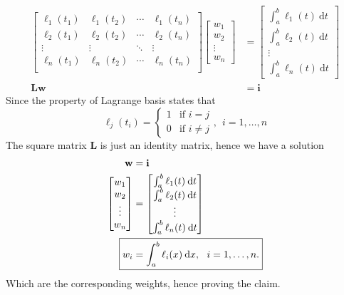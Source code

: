 \begin{align*}
\begin{bmatrix}
\ell_1(t_1) & \ell_1(t_2) & \cdots & \ell_1(t_n) \\
\ell_2(t_1) & \ell_2(t_2) & \cdots & \ell_2(t_n) \\
\vdots & \vdots & \ddots & \vdots\\
\ell_n(t_1) & \ell_n(t_2) & \cdots & \ell_n(t_n) \\
\end{bmatrix}
\begin{bmatrix}
w_1\\
w_2\\
\vdots\\
w_n
\end{bmatrix}
&=
\begin{bmatrix}
\int_{a}^{b}\ell_1(t)\:\mathrm{d}t\\
\int_{a}^{b}\ell_2(t)\:\mathrm{d}t\\
\vdots\\
\int_{a}^{b}\ell_n(t)\:\mathrm{d}t
\end{bmatrix}\\
\mathbf{Lw} &= \mathbf{i}
\end{align*}
Since the property of Lagrange basis states that
\begin{equation*}
\ell_j(t_i) = \begin{cases}
1 & \text{if } i=j\\
0 & \text{if } i\neq j
\end{cases}, \:\: i=1,\ldots,n
\end{equation*}
The square matrix $\mathbf{L}$ is just an identity matrix, hence we have a solution
\begin{align*}
\mathbf{w} &= \mathbf{i}\\
\begin{bmatrix}
w_1\\
w_2\\
\vdots\\
w_n
\end{bmatrix}
&=
\begin{bmatrix}
\int_{a}^{b}\ell_1(t)\:\mathrm{d}t\\
\int_{a}^{b}\ell_2(t)\:\mathrm{d}t\\
\vdots\\
\int_{a}^{b}\ell_n(t)\:\mathrm{d}t
\end{bmatrix}\\
\Aboxed{w_i &= \int_{a}^{b}\ell_i(x)\:\mathrm{d}x, \:\:\:i = 1,\ldots, n.}
\end{align*}
Which are the corresponding weights, hence proving the claim. \qedsymbol